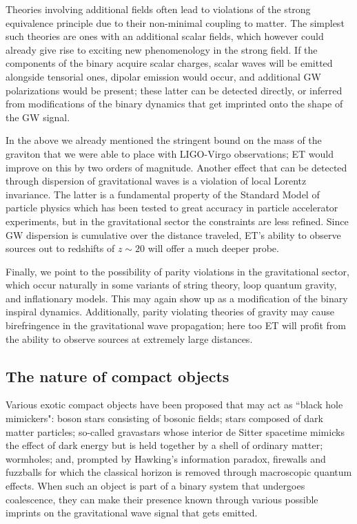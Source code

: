 Theories involving additional fields often lead to violations of the strong equivalence 
principle due to their non-minimal coupling to matter. The simplest such theories are
ones with an additional scalar fields, which however could already give rise to 
exciting new phenomenology in the strong field. If the components of the binary 
acquire scalar charges, scalar waves will be emitted alongside
tensorial ones, dipolar emission would occur, and additional GW polarizations would be
present; these latter can be detected directly, or inferred from modifications of
the binary dynamics that get imprinted onto the shape of the GW signal. 

In the above we already mentioned the stringent bound on the mass of the graviton that we were able
to place with LIGO-Virgo observations; ET would improve on this by two orders of 
magnitude. Another effect that can be detected through dispersion of gravitational waves is a violation
of local Lorentz invariance. The latter is a fundamental property of the Standard Model 
of particle physics which has been tested to great accuracy in particle accelerator experiments, 
but in the gravitational sector the constraints are less refined. Since GW dispersion is
cumulative over the distance traveled, ET's ability to observe sources out to redshifts of
$z \sim 20$ will offer a much deeper probe.

Finally, we point to the possibility of parity violations in the gravitational sector, which 
occur naturally in some variants of string theory, loop quantum gravity, and inflationary 
models. This may again show up as a modification of the binary inspiral dynamics. Additionally,
parity violating theories of gravity may cause birefringence in the gravitational wave propagation; 
here too ET will profit from the ability to observe sources at extremely large distances.

\subsection{The nature of compact objects}

Various exotic compact objects have been proposed that may act as ``black hole mimickers":
boson stars consisting of bosonic fields; stars composed of dark matter particles; 
so-called gravastars whose interior de Sitter spacetime mimicks the effect of dark energy
but is held together by a shell of ordinary matter; wormholes; and, prompted by Hawking's 
information paradox, firewalls and fuzzballs for which the classical horizon is removed
through macroscopic quantum effects. When such an object is part of a binary system that undergoes
coalescence, they can make their presence known through various possible imprints on 
the gravitational wave signal that gets emitted.

